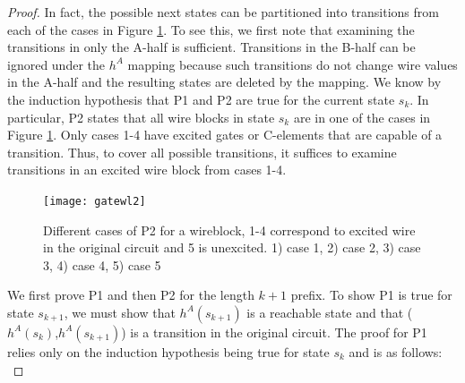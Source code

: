 \documentclass[12pt]{report}
\begin{document}
\begin{proof}
In fact, the possible next states can be partitioned into transitions from each of the cases in Figure \ref{fig:l1helper}.  To see this, we first note that examining the transitions in only the A-half is sufficient.  Transitions in the B-half can be ignored under the $h^A$ mapping because such transitions do not change wire values in the A-half and the resulting states are deleted by the mapping.  We know by the induction hypothesis that P1 and P2 are true for the current state $s_k$.  In particular, P2 states that all wire blocks in state $s_k$ are in one of the cases in Figure \ref{fig:l1helper}.  Only cases 1-4 have excited gates or C-elements that are capable of a transition.  Thus, to cover all possible transitions, it suffices to examine transitions in an excited wire block from cases 1-4. \\

 

\begin{figure}
  \centering
    \texttt{[image: gatewl2]}
  \caption[Different cases of a wireblock]{Different cases of P2 for a wireblock, 1-4 correspond to excited wire in the original circuit and 5 is unexcited.  1) case 1, 2) case 2, 3) case 3, 4) case 4, 5) case 5}
  \label{fig:l1helper}
\end{figure}

We first prove P1 and then P2 for the length $k+1$ prefix.  To show P1 is true for state $s_{k+1}$, we must show that $h^A(s_{k+1})$ is a reachable state and that ($h^A(s_{k})$,$h^A(s_{k+1})$) is a transition in the original circuit.  The proof for P1 relies only on the induction hypothesis being true for state $s_k$ and is as follows: \\


\end{proof}
\end{document}
